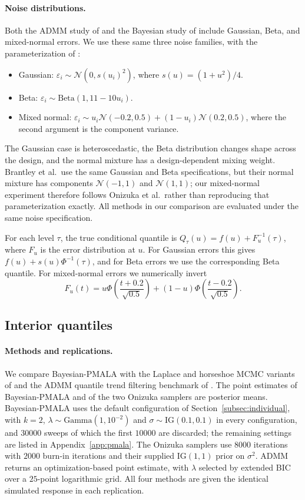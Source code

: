 \paragraph{Noise distributions.} Both the ADMM study of \citet{brantley2020baseline} and the Bayesian study of \citet{onizuka2024fast} include Gaussian, Beta, and mixed-normal errors. We use these same three noise families, with the parameterization of \citet{onizuka2024fast}:
\begin{itemize}
 \item Gaussian: $\varepsilon_i\sim\mathcal{N}(0,s(u_i)^2)$, where $s(u)=(1+u^2)/4$.
 \item Beta: $\varepsilon_i\sim\mathrm{Beta}(1,11-10u_i)$.
 \item Mixed normal: $\varepsilon_i\sim u_i\mathcal{N}(-0.2,0.5)+(1-u_i)\mathcal{N}(0.2,0.5)$, where the second argument is the component variance.
\end{itemize}
The Gaussian case is heteroscedastic, the Beta distribution changes shape across the design, and the normal mixture has a design-dependent mixing weight. Brantley et al.\ use the same Gaussian and Beta specifications, but their normal mixture has components $\mathcal{N}(-1,1)$ and $\mathcal{N}(1,1)$; our mixed-normal experiment therefore follows Onizuka et al.\ rather than reproducing that parameterization exactly. All methods in our comparison are evaluated under the same noise specification.

For each level $\tau$, the true conditional quantile is $Q_\tau(u)=f(u)+F_u^{-1}(\tau)$, where $F_u$ is the error distribution at $u$. For Gaussian errors this gives $f(u)+s(u)\Phi^{-1}(\tau)$, and for Beta errors we use the corresponding Beta quantile. For mixed-normal errors we numerically invert
\[
 F_u(t)=u\Phi\!\left(\frac{t+0.2}{\sqrt{0.5}}\right)
       +(1-u)\Phi\!\left(\frac{t-0.2}{\sqrt{0.5}}\right).
\]

\subsection{Interior quantiles}
\label{sec:sim:individual}

\paragraph{Methods and replications.} We compare Bayesian-PMALA with the Laplace and horseshoe MCMC variants of \citet{onizuka2024fast} and the ADMM quantile trend filtering benchmark of \citet{brantley2020baseline}. The point estimates of Bayesian-PMALA and of the two Onizuka samplers are posterior means. Bayesian-PMALA uses the default configuration of Section~\ref{subsec:individual}, with $k=2$, $\lambda\sim\mathrm{Gamma}(1,10^{-2})$ and $\sigma\sim\mathrm{IG}(0.1,0.1)$ in every configuration, and $30000$ sweeps of which the first $10000$ are discarded; the remaining settings are listed in Appendix~\ref{app:pmala}. The Onizuka samplers use $8000$ iterations with $2000$ burn-in iterations and their supplied $\mathrm{IG}(1,1)$ prior on $\sigma^2$. ADMM returns an optimization-based point estimate, with $\lambda$ selected by extended BIC over a $25$-point logarithmic grid. All four methods are given the identical simulated response in each replication.

